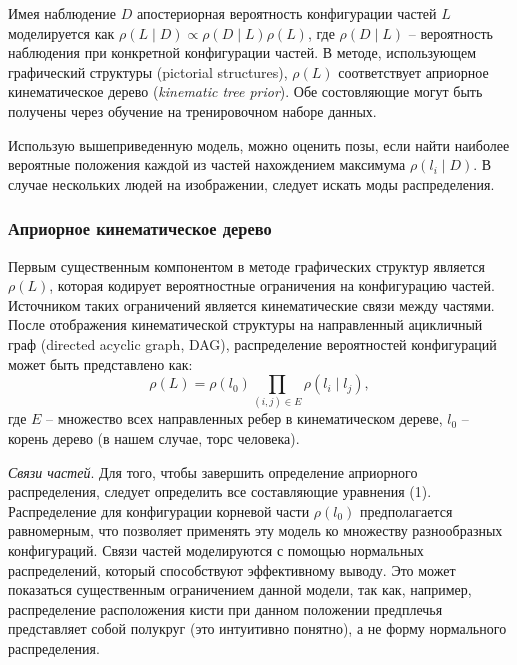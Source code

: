 Имея наблюдение \(D\) апостериорная вероятность конфигурации частей \(L\) моделируется как \(\rho(L{\mid}D)\propto\rho(D{\mid}L)\rho(L)\), где \(\rho(D{\mid}L)\) -- вероятность наблюдения при конкретной конфигурации частей. В методе, использующем графический структуры (pictorial structures), \(\rho(L)\) соответствует априорное кинематическое дерево (\emph{kinematic tree prior}). Обе состовляющие могут быть получены через обучение на тренировочном наборе данных.

Использую вышеприведенную модель, можно оценить позы, если найти наиболее вероятные положения каждой из частей нахождением максимума \(\rho(l_i{\mid}D)\). В случае нескольких людей на изображении, следует искать моды распределения.

\subsubsection{Априорное кинематическое дерево}

Первым существенным компонентом в методе графических структур является \(\rho(L)\), которая кодирует вероятностные ограничения на конфигурацию частей. Источником таких ограничений является кинематические связи между частями. После отображения кинематической структуры на направленный ацикличный граф (directed acyclic graph, DAG), распределение вероятностей конфигураций может быть представлено как:
\begin{equation}
  \rho(L) = \rho(l_0)\prod_{(i,j){\in}E}\rho(l_i{\mid}l_j),
\end{equation}
где \(E\) -- множество всех направленных ребер в кинематическом дереве, \(l_0\) -- корень дерево (в нашем случае, торс человека).

\emph{Связи частей}. Для того, чтобы завершить определение априорного распределения, следует определить все составляющие уравнения (1). Распределение для конфигурации корневой части \(\rho(l_0)\) предполагается равномерным, что позволяет применять эту модель ко множеству разнообразных конфигураций. Связи частей моделируются с помощью нормальных распределений, который способствуют эффективному выводу. Это может показаться существенным ограничением данной модели, так как, например, распределение расположения кисти при данном положении предплечья представляет собой полукруг (это интуитивно понятно), а не форму нормального распределения.

